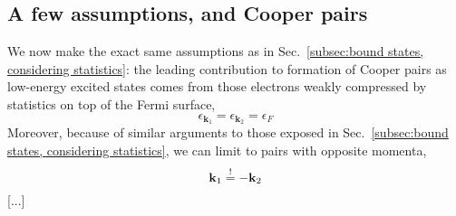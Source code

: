 \subsection{A few assumptions, and Cooper pairs}

We now make the exact same assumptions as in Sec.~\ref{subsec:bound states, considering statistics}: the leading contribution to formation of Cooper pairs as low-energy excited states comes from those electrons weakly compressed by statistics on top of the Fermi surface,
\[
	\epsilon_{\mathbf{k}_1} = \epsilon_{\mathbf{k}_2} = \epsilon_F
\]
Moreover, because of similar arguments to those exposed in Sec.~\ref{subsec:bound states, considering statistics}, we can limit to pairs with opposite momenta,
\[
	\mathbf{k}_1 \stackrel{!}{=} - \mathbf{k}_2
\]
[...]
